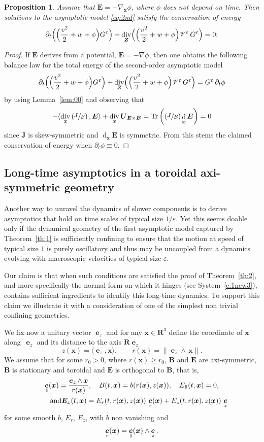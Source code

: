 \documentclass[JEP,XML,SOM,Unicode]{cedram}
\let\mathcal\mathscr
\newcommand{\sperp}{{\scriptscriptstyle\perp}}
\newcommand{\Psfrac}[2]{(\sfrac{#1}{#2})}
\let\eps\varepsilon
\let\d\partial
\DeclareMathOperator\dD{d}\let\dd\dD
\DeclareMathOperator{\Tr}{Tr}
\DeclareMathOperator{\Div}{div}
\theoremstyle{plain}
\newtheorem{proposition}[theorem]{Proposition}
\theoremstyle{definition}
\newcommand{\bpr}{\begin{proposition}}
\newcommand{\epr}{\end{proposition}}
\newcommand\R{\mathbf R}
\newcommand\bB{{\boldsymbol B}}
\newcommand\bE{{\boldsymbol E}}
\newcommand\bJ{{\boldsymbol J}}
\newcommand\bU{{\boldsymbol U}}
\newcommand\bfx{{\boldsymbol x}}
\newcommand\bfZ{{\boldsymbol Z}}
\newcommand\cV{{\mathcal V}}
\DeclareMathOperator{\beD}{\boldsymbol{e}}
\newcommand\eDr{\beD_r}
\newcommand\eDz{\beD_z}
\newcommand\eDpar{\beD_\mypar}
\let\e w
\newcommand\Epar{E_\mypar}
\newcommand\Eperp{\bE_{\!\sperp}}
\newcommand\Er{E_r}
\newcommand\Ez{E_z}
\newcommand{\EcB}{\bU_{\bE\times\bB}}
\newcommand{\mypar}{{\mkern3mu\vphantom{\perp}\vrule depth 0pt\mkern2mu\vrule depth 0pt\mkern3mu}}
\begin{document}
\bpr
Assume that $\bE=-\nabla_\bfx\phi$, where $\phi$ does not depend on time. Then solutions to the asymptotic model \eqref{eq:2nd} satisfy the conservation of energy
\[
\d_t \Bigl(\Bigl(\frac{v^2}{2}+\e+\phi\Bigr)G^\eps\Bigr)+\Div_{\bfZ} \Bigl(\Bigl(\frac{v^2}{2}+\e+\phi\Bigr)\cV^\eps\, G^\eps\Bigr)
=0;
\]
\epr
\begin{proof}
If $\bE$ derives from a potential, $\bE=-\nabla\phi$, then one obtains the following balance law for the total energy of the second-order asymptotic model
\[
\d_t \Bigl(\Bigl(\frac{v^2}{2}+\e+\phi\Bigr)G^\eps\Bigr)+\Div_{\bfZ} \Bigl(\Bigl(\frac{v^2}{2}+\e+\phi\Bigr)\cV^\eps \,G^\eps\Bigr)
=G^\eps\,\d_t\phi
\]
by using Lemma~\ref{lem:00} and observing that
\[
-\langle
\Div_\bfx\left(\sfrac{\bJ}{B}\right),\bE\rangle
+\Div_\bfx\EcB
=
\Tr\left(\Psfrac{\bJ}{B}\dD_\bfx\bE\right)=0
\]
since $\bJ$ is skew-symmetric and $\dD_\bfx\bE$ is symmetric. From this stems the claimed conservation of energy when $\d_t\phi\equiv0$.
\end{proof}

\subsection{Long-time asymptotics in a toroidal axi-symmetric geometry}\label{s:poloidal-results}

Another way to unravel the dynamics of slower components is to derive asymptotics that hold on time scales of typical size $1/\eps$. Yet this seems doable only if the dynamical geometry of the first asymptotic model captured by Theorem~\ref{th:1} is sufficiently confining to ensure that the motion at speed of typical size $1$ is purely oscillatory and thus may be uncoupled from a dynamics evolving with macroscopic velocities of typical size $\eps$.

Our claim is that when such conditions are satisfied the proof of Theorem~\ref{th:2}, and more specifically the normal form on which it hinges (see System~\eqref{e:1new3}), contains sufficient ingredients to identify this long-time dynamics. To support this claim we illustrate it with a consideration of one of the simplest non trivial confining geometries.

We fix now a unitary vector $\eDz$ and for any $\bfx\in\R^3$ define the coordinate of $\bfx$ along~$\eDz$ and its distance to the axis $\R\eDz$
\[
z(\bfx)=\langle\eDz,\bfx\rangle,\qquad
r(\bfx)=\|\eDz\wedge\,\bfx\|.
\]
We assume that for some $r_0>0$, where $r(\bfx)\geq r_0$, $\bB$ and $\bE$ are axi-symmetric, $\bB$ is stationary and toroidal and $\bE$ is orthogonal to $\bB$, that is,
\begin{gather*}
\eDpar(\bfx)=\frac{\eDz\wedge\,\bfx}{r(\bfx)},\quad
B(t,\bfx)=b(r(\bfx),z(\bfx)),\quad\Epar(t,\bfx)=0,
\\
\tag*{and}
\Eperp(t,\bfx)=\Er(t,r(\bfx),z(\bfx))\,\eDr(\bfx)+\Ez(t,r(\bfx),z(\bfx))\,\eDz
\end{gather*}
for some smooth $b$, $\Er$, $\Ez$, with $b$ non vanishing and
\[
\eDr(\bfx)=\eDpar(\bfx)\wedge\eDz.
\]
\end{document}

